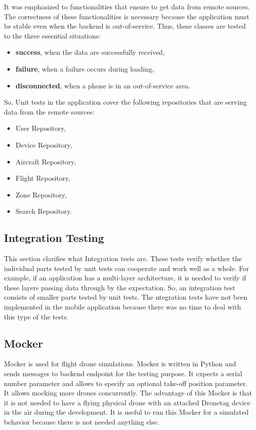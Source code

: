 It was emphasized to functionalities that ensure to get data from remote sources.
The correctness of these functionalities is necessary because the application must be stable even when the backend is out-of-service.
Thus, these classes are tested to the three essential situations:
\begin{itemize}
    \item \textbf{success}, when the data are successfully received,
    \item \textbf{failure}, when a failure occurs during loading,
    \item \textbf{disconnected}, when a phone is in an out-of-service area.
\end{itemize}
So, Unit tests in the application cover the following repositories that are serving data from the remote sources:
\begin{itemize}
    \item User Repository,
    \item Device Repository,
    \item Aircraft Repository,
    \item Flight Repository,
    \item Zone Repository,
    \item Search Repository.
\end{itemize}


\subsection{Integration Testing}\label{subsec:integration-testing}
This section clarifies what Integration tests are.
These tests verify whether the individual parts tested by unit tests can cooperate and work well as a whole.
For example, if an application has a multi-layer architecture, it is needed to verify if these layers passing data through by the expectation.
So, an integration test consists of smaller parts tested by unit tests.
The ntegration tests have not been implemented in the mobile application because there was no time to deal with this type of the tests.


\subsection{Mocker}\label{subsec:mocker}
Mocker is used for flight drone simulations.
Mocker is written in Python and sends messages to backend endpoint for the testing purpose.
It expects a serial number parameter and allows to specify an optional take-off position parameter.
It allows mocking more drones concurrently.
The advantage of this Mocker is that it is not needed to have a flying physical drone with an attached Dronetag device in the air during the development.
It is useful to run this Mocker for a simulated behavior because there is not needed anything else.
